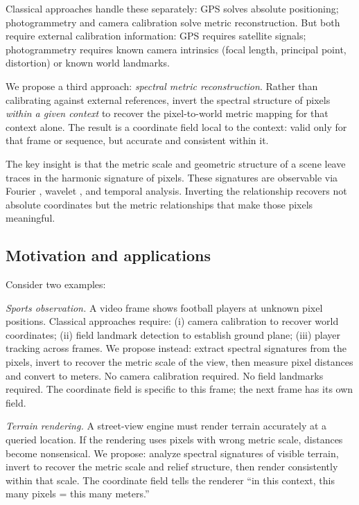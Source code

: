 \documentclass[11pt,twocolumn,a4paper]{article}
\theoremstyle{definition}
\begin{document}
Classical approaches handle these separately: GPS solves absolute positioning; photogrammetry and camera calibration \citep{hartley2003,zhang2000} solve metric reconstruction. But both require external calibration information: GPS requires satellite signals; photogrammetry requires known camera intrinsics (focal length, principal point, distortion) or known world landmarks.

We propose a third approach: \emph{spectral metric reconstruction}. Rather than calibrating against external references, invert the spectral structure of pixels \emph{within a given context} to recover the pixel-to-world metric mapping for that context alone. The result is a coordinate field local to the context: valid only for that frame or sequence, but accurate and consistent within it.

The key insight is that the metric scale and geometric structure of a scene leave traces in the harmonic signature of pixels. These signatures are observable via Fourier \citep{oppenheim1989}, wavelet \citep{mallat1989}, and temporal analysis. Inverting the relationship recovers not absolute coordinates but the metric relationships that make those pixels meaningful.

\subsection{Motivation and applications}

Consider two examples:

\emph{Sports observation.} A video frame shows football players at unknown pixel positions. Classical approaches require: (i) camera calibration to recover world coordinates; (ii) field landmark detection to establish ground plane; (iii) player tracking across frames. We propose instead: extract spectral signatures from the pixels, invert to recover the metric scale of the view, then measure pixel distances and convert to meters. No camera calibration required. No field landmarks required. The coordinate field is specific to this frame; the next frame has its own field.

\emph{Terrain rendering.} A street-view engine must render terrain accurately at a queried location. If the rendering uses pixels with wrong metric scale, distances become nonsensical. We propose: analyze spectral signatures of visible terrain, invert to recover the metric scale and relief structure, then render consistently within that scale. The coordinate field tells the renderer ``in this context, this many pixels = this many meters.''
\end{document}

